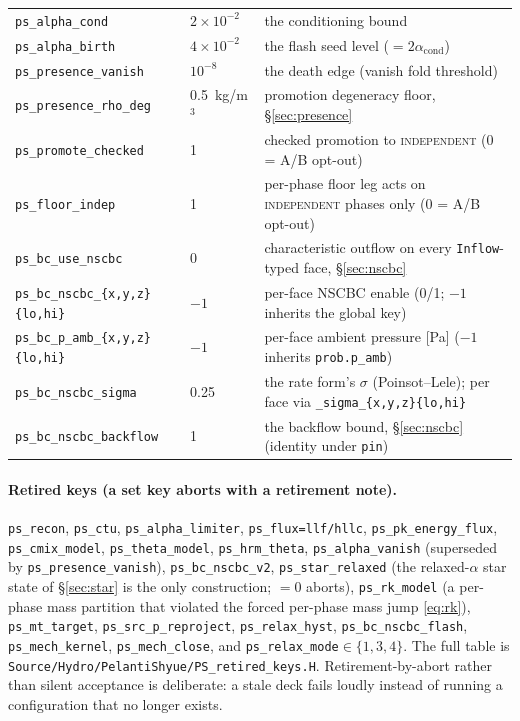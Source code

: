 \documentclass[11pt,a4paper]{article}
\newcommand{\code}[1]{\texttt{\small #1}}
\begin{document}
\begin{center}
\begin{tabular}{@{}ll>{\raggedright\arraybackslash}p{}@{}}
\code{ps\_alpha\_cond}       & $2\times10^{-2}$ & the conditioning bound \\
\code{ps\_alpha\_birth}      & $4\times10^{-2}$ & the flash seed level ($=2\alpha_{\mathrm{cond}}$) \\
\code{ps\_presence\_vanish}  & $10^{-8}$ & the death edge (vanish fold threshold) \\
\code{ps\_presence\_rho\_deg} & 0.5~kg/m$^3$ & promotion degeneracy floor, \S\ref{sec:presence} \\
\code{ps\_promote\_checked}  & 1 & checked promotion to \textsc{independent} (0 = A/B opt-out) \\
\code{ps\_floor\_indep}      & 1 & per-phase floor leg acts on \textsc{independent} phases only (0 = A/B opt-out) \\
\code{ps\_bc\_use\_nscbc}    & 0 & characteristic outflow on every \code{Inflow}-typed face, \S\ref{sec:nscbc} \\
\code{ps\_bc\_nscbc\_\{x,y,z\}\{lo,hi\}} & $-1$ & per-face NSCBC enable (0/1; $-1$ inherits the global key) \\
\code{ps\_bc\_p\_amb\_\{x,y,z\}\{lo,hi\}} & $-1$ & per-face ambient pressure [Pa] ($-1$ inherits \code{prob.p\_amb}) \\
\code{ps\_bc\_nscbc\_sigma}  & 0.25 & the rate form's $\sigma$ (Poinsot--Lele); per face via \code{\_sigma\_\{x,y,z\}\{lo,hi\}} \\
\code{ps\_bc\_nscbc\_backflow} & 1 & the backflow bound, \S\ref{sec:nscbc} (identity under \code{pin}) \\
\bottomrule
\end{tabular}
\end{center}

\paragraph{Retired keys (a set key aborts with a retirement note).}
\code{ps\_recon}, \code{ps\_ctu}, \code{ps\_alpha\_limiter},
\code{ps\_flux=llf/hllc}, \code{ps\_pk\_energy\_flux},
\code{ps\_cmix\_model}, \code{ps\_theta\_model}, \code{ps\_hrm\_theta},
\code{ps\_alpha\_vanish} (superseded by \code{ps\_presence\_vanish}),
\code{ps\_bc\_nscbc\_v2}, \code{ps\_star\_relaxed} (the relaxed-$\alpha$
star state of \S\ref{sec:star} is the only construction; $=0$ aborts),
\code{ps\_rk\_model} (a per-phase mass partition that violated the forced
per-phase mass jump \eqref{eq:rk}), \code{ps\_mt\_target},
\code{ps\_src\_p\_reproject}, \code{ps\_relax\_hyst},
\code{ps\_bc\_nscbc\_flash}, \code{ps\_mech\_kernel},
\code{ps\_mech\_close}, and \code{ps\_relax\_mode}$\in\{1,3,4\}$.  The
full table is \code{Source/Hydro/PelantiShyue/PS\_retired\_keys.H}.  Retirement-by-abort rather than silent
acceptance is deliberate: a stale deck fails loudly instead of running a
configuration that no longer exists.
\end{document}
